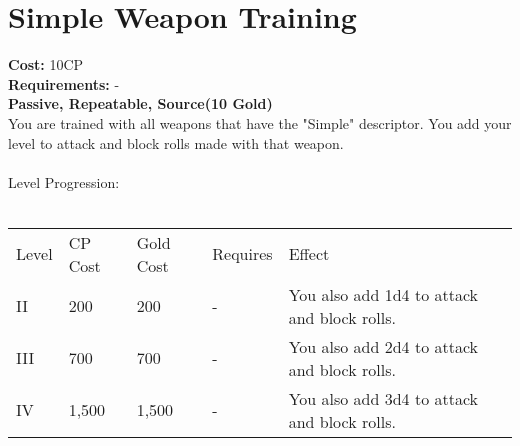 \section{Simple Weapon Training}
\textbf{Cost:} 10CP\\
\textbf{Requirements:} -\\
\textbf{Passive, Repeatable, Source(10 Gold)}\\
You are trained with all weapons that have the "Simple" descriptor. You add your level to attack and block rolls made with that weapon.\\
\\
Level Progression:\\
\\
\begin{tabular}{l | l | l | l | l}
	Level & CP Cost & Gold Cost & Requires & Effect\\
	II & 200 & 200 & - & You also add 1d4 to attack and block rolls.\\
	III & 700 & 700 & - & You also add 2d4 to attack and block rolls.\\
	IV & 1,500 & 1,500 & - & You also add 3d4 to attack and block rolls.\\
\end{tabular}